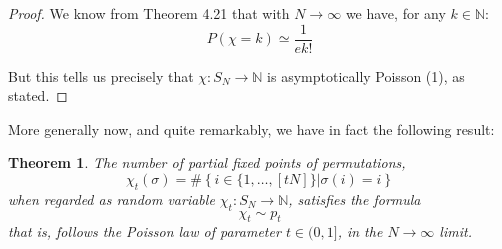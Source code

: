 \documentclass[12pt]{amsbook}
\newtheorem{theorem}{Theorem}[chapter]
\begin{document}
\begin{proof}
We know from Theorem 4.21 that with $N\to\infty$ we have, for any $k\in\mathbb N$:
$$P(\chi=k)\simeq\frac{1}{ek!}$$

But this tells us precisely that $\chi:S_N\to\mathbb N$ is asymptotically Poisson (1), as stated.
\end{proof}

More generally now, and quite remarkably, we have in fact the following result:


\begin{theorem}
The number of partial fixed points of permutations,
$$\chi_t(\sigma)=\#\left\{i\in\{1,\ldots,[tN]\}\Big|\sigma(i)=i\right\}$$ 
when regarded as random variable $\chi_t:S_N\to\mathbb N$, satisfies the formula
$$\chi_t\sim p_t$$
that is, follows the Poisson law of parameter $t\in(0,1]$, in the $N\to\infty$ limit.
\end{theorem}
\end{document}
